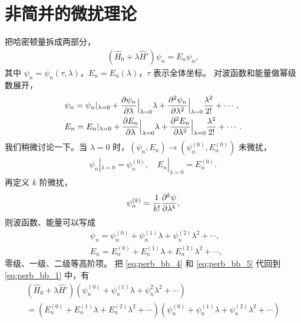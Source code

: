 \section{非简并的微扰理论}
把哈密顿量拆成两部分，
\begin{align}
    (\hat H_0 + \lambda \hat H') \psi_n = E_n \psi_n, 
    \label{eq:perb_bb_1}
\end{align}
其中 $\psi_n = \psi_n(\tau, \lambda)$，$E_n = E_n(\lambda)$，$\tau$ 表示全体坐标。 
对波函数和能量做幂级数展开，
\begin{align}
    &\psi_n = \psi_n |_{\lambda = 0} + \pdv{\psi_n}{\lambda}\Big|_{\lambda = 0}\lambda + \pdv[2]{\psi_n}{\lambda}\Big|_{\lambda = 0} \frac{\lambda^2}{2!} + \cdots, 
    \label{eq:perb_bb_2} %
    \\
    &E_n = E_n |_{\lambda = 0} + \pdv{E_n}{\lambda}\Big|_{\lambda = 0}\lambda + \pdv[2]{E_n}{\lambda}\Big|_{\lambda = 0} \frac{\lambda^2}{2!} + \cdots. 
    \label{eq:perb_bb_3}
\end{align}
我们稍微讨论一下。当 $\lambda = 0$ 时，$(\psi_n, E_n) \rightarrow (\psi_n^{(0)}, E_n^{(0)})$ 未微扰，
\begin{align}
    \psi_n |_{\lambda=0} = \psi_n^{(0)}, \quad E_n|_{\lambda=0} = E_n^{(0)}. 
\end{align}
再定义 $k$ 阶微扰，
\begin{align}
    \psi_n^{(k)} = \frac1{k!} \pdv[k]{\psi}{\lambda},
\end{align}
则波函数、能量可以写成
\begin{align}
    &\psi_n = \psi_n^{(0)} + \psi_n^{(1)}\lambda + \psi_n^{(2)} \lambda^2 + \cdots, \label{eq:perb_bb_4}\\
    &E_n = E_n^{(0)} + E_n^{(1)} \lambda + E_n^{(2)}\lambda^2 + \cdots, \label{eq:perb_bb_5}
\end{align}
零级、一级、二级等高阶项。
把 \eqref{eq:perb_bb_4} 和 \eqref{eq:perb_bb_5} 代回到 \eqref{eq:perb_bb_1} 中，有
\begin{multline}
    (\hat H_0 + \lambda \hat H') \left(
        \psi_n^{(0)} + \psi_n^{(1)}\lambda + \psi_n^{2} \lambda^2 + \cdots
    \right) \\= 
    \left(
        E_n^{(0)} + E_n^{(1)} \lambda + E_n^{(2)}\lambda^2 + \cdots
    \right)
    \left(
        \psi_n^{(0)} + \psi_n^{(1)}\lambda + \psi_n^{(2)} \lambda^2 + \cdots
    \right)
\end{multline}

